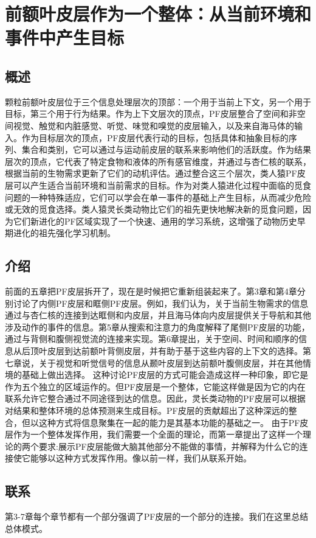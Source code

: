 \chapter{前额叶皮层作为一个整体：从当前环境和事件中产生目标} \label{chap:chap8}

\section{概述}
颗粒前额叶皮层位于三个信息处理层次的顶部：一个用于当前上下文，另一个用于目标，第三个用于行为结果。作为上下文层次的顶点，PF皮层整合了空间和非空间视觉、触觉和内脏感觉、听觉、味觉和嗅觉的皮层输入，以及来自海马体的输入。作为目标层次的顶点，PF皮层代表行动的目标，包括具体和抽象目标的序列、集合和类别，它可以通过与运动前皮层的联系来影响他们的活跃度。作为结果层次的顶点，它代表了特定食物和液体的所有感官维度，并通过与杏仁核的联系，根据当前的生物需求更新了它们的动机评估。通过整合这三个层次，类人猿PF皮层可以产生适合当前环境和当前需求的目标。作为对类人猿进化过程中面临的觅食问题的一种特殊适应，它们可以学会在单一事件的基础上产生目标，从而减少危险或无效的觅食选择。类人猿灵长类动物比它们的祖先更快地解决新的觅食问题，因为它们新进化的PF区域实现了一个快速、通用的学习系统，这增强了动物历史早期进化的祖先强化学习机制。

\section{介绍}
前面的五章把PF皮层拆开了，现在是时候把它重新组装起来了。第3章和第4章分别讨论了内侧PF皮层和眶侧PF皮层。例如，我们认为，关于当前生物需求的信息通过与杏仁核的连接到达眶侧和内皮层，并且海马体向内皮层提供关于导航和其他涉及动作的事件的信息。第5章从搜索和注意力的角度解释了尾侧PF皮层的功能，通过与背侧和腹侧视觉流的连接来实现。第6章提出，关于空间、时间和顺序的信息从后顶叶皮层到达前额叶背侧皮层，并有助于基于这些内容的上下文的选择。第七章说，关于视觉和听觉信号的信息从颞叶皮层到达前额叶腹侧皮层，并在其他情境的基础上做出选择。
这种讨论PF皮层的方式可能会造成这样一种印象，即它是作为五个独立的区域运作的。但PF皮层是一个整体，它能这样做是因为它的内在联系允许它整合通过不同途径到达的信息。因此，灵长类动物的PF皮层可以根据对结果和整体环境的总体预测来生成目标。PF皮层的贡献超出了这种深远的整合，但以这种方式将信息聚集在一起的能力是其基本功能的基础之一。
由于PF皮层作为一个整体发挥作用，我们需要一个全面的理论，而第一章提出了这样一个理论的两个要求:展示PF皮层能做大脑其他部分不能做的事情，并解释为什么它的连接使它能够以这种方式发挥作用。像以前一样，我们从联系开始。

\section{联系}
第3-7章每个章节都有一个部分强调了PF皮层的一个部分的连接。我们在这里总结总体模式。

